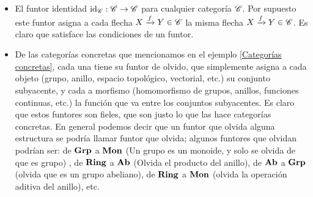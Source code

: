 \documentclass{comunicaciones}
\begin{document}
\begin{ej}
    \begin{itemize}
        \item El funtor identidad $\mathrm{id}_\mathscr C:\mathscr C\to\mathscr C$ para cualquier categoría $\mathscr C$. Por supuesto este funtor asigna a cada flecha $X\xrightarrow{f}Y\in\mathscr C$ 
        la misma flecha $X\xrightarrow{f}Y\in\mathscr C$. Es claro que satisface las condiciones de un funtor.
        \item De las categorías concretas que mencionamos en el ejemplo \ref{Categorías concretas}, cada una tiene su funtor de olvido, que simplemente 
        asigna a cada objeto (grupo, anillo, espacio topológico, vectorial, etc.) su conjunto subyacente, y cada a morfismo (homomorfismo de grupos, anillos,
        funciones continuas, etc.) la función que va entre los conjuntos subyacentes. Es claro que estos funtores son fieles, que son justo lo que las hace
        categorías concretas. En general podemos decir que un funtor que olvida alguna estructura se podría llamar funtor que olvida; algunos funtores
        que olvidan podrían ser: de $\mathbf{Grp}$ a $\mathbf{Mon}$ (Un grupo es un monoide, y solo se olvida de que es grupo) , de $\mathbf{Ring}$ a $\mathbf{Ab}$ (Olvida el producto del
        anillo), de $\mathbf{Ab}$ a $\mathbf{Grp}$ (olvida que es un grupo abeliano), de $\mathbf{Ring}$ a $\mathbf{Mon}$ (olvida la operación aditiva del anillo), etc.
    \end{itemize}
\end{ej}
\end{document}
